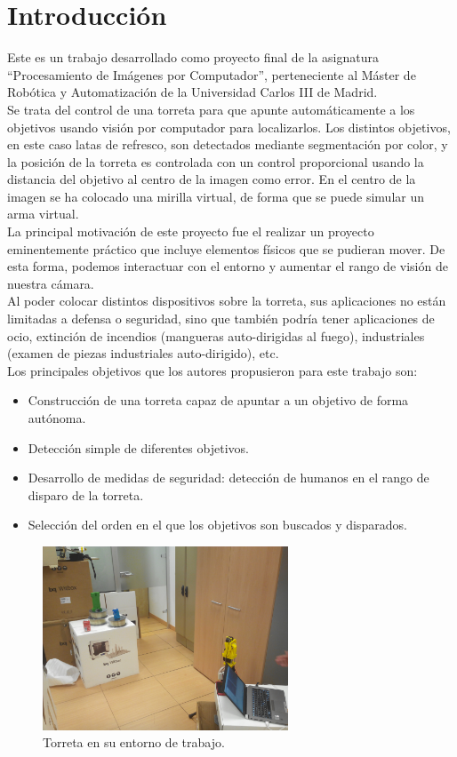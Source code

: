 \section{Introducción}
Este es un trabajo desarrollado como proyecto final de la asignatura “Procesamiento de Imágenes por Computador”, perteneciente al Máster de Robótica y Automatización de la Universidad Carlos III de Madrid.\\

Se trata del control de una torreta para que apunte automáticamente a los objetivos usando visión por computador para localizarlos. Los distintos objetivos, en este caso latas de refresco, son detectados mediante segmentación por color, y la posición de la torreta es controlada con un control proporcional usando la distancia del objetivo al centro de la imagen como error. En el centro de la imagen se ha colocado una mirilla virtual, de forma que se puede simular un arma virtual.\\

La principal motivación de este proyecto fue el realizar un proyecto eminentemente práctico que incluye elementos físicos que se pudieran mover. De esta forma, podemos interactuar con el entorno y aumentar el rango de visión de nuestra cámara.\\

Al poder colocar distintos dispositivos sobre la torreta, sus aplicaciones no están limitadas a defensa o seguridad, sino que también podría tener aplicaciones de ocio, extinción de incendios (mangueras auto-dirigidas al fuego), industriales (examen de piezas industriales auto-dirigido), etc.\\

Los principales objetivos que los autores propusieron para este trabajo son:
\begin{itemize}
\item Construcción de una torreta capaz de apuntar a un objetivo de forma autónoma.
\item Detección simple de diferentes objetivos.
\item Desarrollo de medidas de seguridad: detección de humanos en el rango de disparo de la torreta.
\item Selección del orden en el que los objetivos son buscados y disparados.
\end{itemize}

\begin{figure}[h]
\centering
\includegraphics[width=0.65\textwidth]{images/bq.jpg}%
\caption{Torreta en su entorno de trabajo.}
\label{}
\end{figure}
\FloatBarrier

